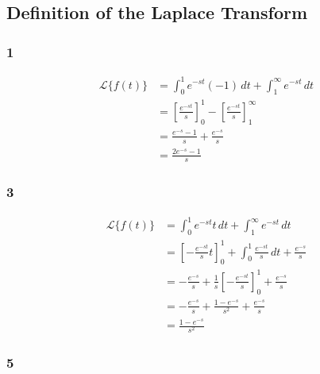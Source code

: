 \documentclass{article}
\begin{document}
\subsection{Definition of the Laplace Transform}

\subsubsection{1}

\begin{align*}
  \mathcal{L}\{f(t)\} & = \int_0^1 e^{-s t} (-1) \,dt + \int_1^\infty e^{-s t} \,dt                          \\
                      & = \left[ \frac{e^{-s t}}{s} \right]_0^1 - \left[ \frac{e^{-s t}}{s} \right]_1^\infty \\
                      & = \frac{e^{-s} - 1}{s} + \frac{e^{-s}}{s}                                            \\
                      & = \frac{2 e^{-s} - 1}{s}
\end{align*}

\subsubsection{3}

\begin{align*}
  \mathcal{L}\{f(t)\} & = \int_0^1 e^{-s t} t \,dt + \int_1^\infty e^{-s t} \,dt                                         \\
                      & = \left[ -\frac{e^{-s t}}{s} t \right]_0^1 + \int_0^1 \frac{e^{-s t}}{s} \,dt + \frac{e^{-s}}{s} \\
                      & = -\frac{e^{-s}}{s} + \frac{1}{s} \left[ -\frac{e^{-s t}}{s} \right]_0^1 + \frac{e^{-s}}{s}      \\
                      & = -\frac{e^{-s}}{s} + \frac{1 - e^{-s}}{s^2} + \frac{e^{-s}}{s}                                  \\
                      & = \frac{1 - e^{-s}}{s^2}
\end{align*}

\subsubsection{5}
\end{document}
